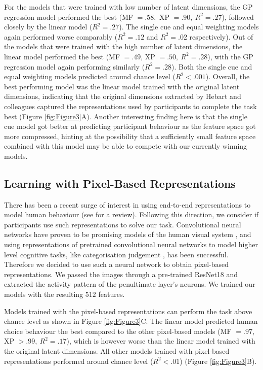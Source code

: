 \documentclass[10pt]{article}
\begin{document}
For the models that were trained with low number of latent dimensions, the GP regression model performed the best (MF $= .58,$ XP $=.90, \: R^2 = .27$), followed closely by the linear model ($ R^2 = .27$). The single cue and equal weighting models again performed worse comparably ($R^2 = .12$ and $R^2 = .02$ respectively). Out of the models that were trained with the high number of latent dimensions, the linear model performed the best (MF $= .49$, XP $=.50, \: R^2 = .28$), with the GP regression model again performing similarly ($ R^2 = .28$). Both the single cue and equal weighting models predicted around chance level ($R^2 < .001$). Overall, the best performing model was the linear model trained with the original latent dimensions, indicating that the original dimensions extracted by Hebart and colleagues captured the representations used by participants to complete the task best (Figure \ref{fig:Figure3}A). Another interesting finding here is that the single cue model got better at predicting participant behaviour as the feature space got more compressed, hinting at the possibility that a sufficiently small feature space combined with this model may be able to compete with our currently winning models.

\subsection{Learning with Pixel-Based Representations}

There has been a recent surge of interest in using end-to-end representations to model human behaviour (see \citet{battleday_convolutional_2021} for a review). Following this direction, we consider if participants use such representations to solve our task. Convolutional neural networks have proven to be promising models of the human visual system \citep{yamins_using_2016}, and using representations of pretrained convolutional neural networks to model higher level cognitive tasks, like categorisation judgement \citep{battleday_capturing_2020}, has been successful. Therefore we decided to use such a neural network to obtain pixel-based representations. We passed the images through a pre-trained ResNet18 \citep{he_deep_2016} and extracted the activity pattern of the penultimate layer's neurons. We trained our models with the resulting $512$ features.

Models trained with the pixel-based representations can perform the task above chance level as shown in Figure \ref{fig:Figure3}C. The linear model predicted human choice behaviour the best compared to the other pixel-based models (MF $= .97$, XP $>.99, \:R^2=.17$), which is however worse than the linear model trained with the original latent dimensions. All other models trained with pixel-based representations performed around chance level ($R^2 < .01$) (Figure \ref{fig:Figure3}B). 
\end{document}
